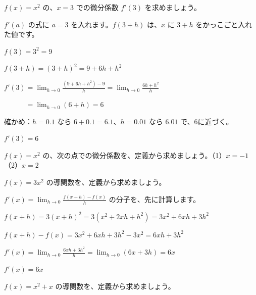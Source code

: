 \begin{reidai}[微分係数を定義から求める]
$f(x)=x^2$ の、$x=3$ での微分係数 $f'(3)$ を求めましょう。\par
\kangaekata $f'(a)$ の式に $a=3$ を入れます。$f(3+h)$ は、$x$ に $3+h$ をかっこごと入れた値です。\par
\shiki $f(3)=3^2=9$\par
\hspace*{2.6\zw}$f(3+h)=(3+h)^2=9+6h+h^2$\par
\hspace*{2.6\zw}$f'(3)=\displaystyle\lim_{h\to0}\frac{(9+6h+h^2)-9}{h}=\lim_{h\to0}\frac{6h+h^2}{h}$\par
\hspace*{2.6\zw}$\phantom{f'(3)}=\displaystyle\lim_{h\to0}(6+h)=6$\par
\hspace*{2.6\zw}確かめ：$h=0.1$ なら $6+0.1=6.1$、$h=0.01$ なら $6.01$ で、6に近づく。\par
\kotae $f'(3)=6$
\end{reidai}

\begin{jibun}
$f(x)=x^2$ の、次の点での微分係数を、定義から求めましょう。\quad（1）$x=-1$\quad（2）$x=2$
\end{jibun}

\begin{reidai}[導関数を求める]
$f(x)=3x^2$ の導関数を、定義から求めましょう。\par
\kangaekata $f'(x)=\displaystyle\lim_{h\to0}\frac{f(x+h)-f(x)}{h}$ の分子を、先に計算します。\par
\shiki $f(x+h)=3(x+h)^2=3(x^2+2xh+h^2)=3x^2+6xh+3h^2$\par
\hspace*{2.6\zw}$f(x+h)-f(x)=3x^2+6xh+3h^2-3x^2=6xh+3h^2$\par
\hspace*{2.6\zw}$f'(x)=\displaystyle\lim_{h\to0}\frac{6xh+3h^2}{h}=\lim_{h\to0}(6x+3h)=6x$\par
\kotae $f'(x)=6x$
\end{reidai}

\begin{jibun}
$f(x)=x^2+x$ の導関数を、定義から求めましょう。
\end{jibun}

